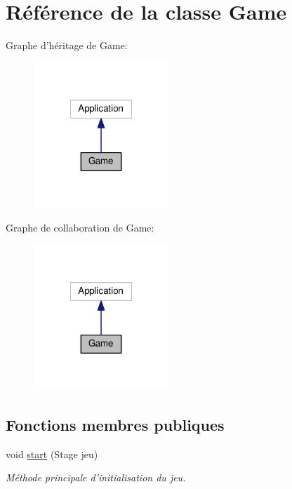 \hypertarget{class_game}{\section{Référence de la classe Game}
\label{class_game}
}


Graphe d'héritage de Game\-:
\nopagebreak
\begin{figure}[H]
\begin{center}
\leavevmode
\includegraphics[width=144pt]{class_game__inherit__graph}
\end{center}
\end{figure}


Graphe de collaboration de Game\-:
\nopagebreak
\begin{figure}[H]
\begin{center}
\leavevmode
\includegraphics[width=144pt]{class_game__coll__graph}
\end{center}
\end{figure}
\subsection*{Fonctions membres publiques}
\begin{DoxyCompactItemize}
\item 
void \hyperlink{class_game_af537a745b82fdda8087d19cb61abb043}{start} (Stage jeu)
\begin{DoxyCompactList}\small\item\em Méthode principale d'initialisation du jeu. \end{DoxyCompactList}\end{DoxyCompactItemize}
